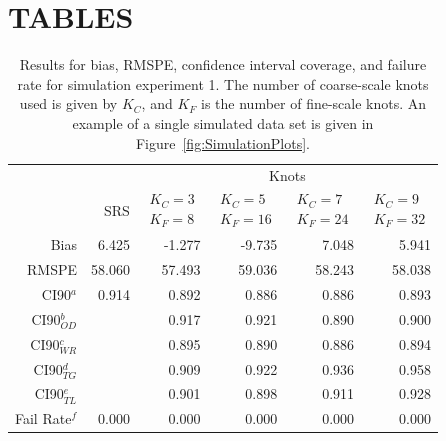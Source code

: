 \documentclass[12pt, titlepage]{article}\usepackage[]{graphicx}\usepackage[]{color}
\begin{document}
\clearpage

\section*{TABLES}



\footnotesize
\begin{table}[ht]
\caption{Results for bias, RMSPE, confidence interval coverage, and failure rate for simulation experiment 1. The number of coarse-scale knots used is given by $K_C$, and $K_F$ is the number of fine-scale knots. An example of a single simulated data set is given in Figure~\ref{fig:SimulationPlots}. \label{Tab:Sim1}}
\begin{center}
\begin{tabular}{rrrrrr}
  \hline
  \hline
	&  & \multicolumn{4}{c}{Knots} \\ 
 & SRS & $\begin{array}{c}K_C=3  \\ K_F=8 \end{array}$ & $\begin{array}{c}K_C=5  \\ K_F=16 \end{array}$ & $\begin{array}{c}K_C=7  \\ K_F=24 \end{array}$ & $\begin{array}{c}K_C=9  \\ K_F=32 \end{array}$ \\
  \hline
 Bias & 6.425 & -1.277 & -9.735 & 7.048 & 5.941 \\ 
  RMSPE & 58.060 & 57.493 & 59.036 & 58.243 & 58.038 \\ 
  CI90$^a$ & 0.914 & 0.892 & 0.886 & 0.886 & 0.893 \\ 
  CI90$_{OD}^b$ &  & 0.917 & 0.921 & 0.890 & 0.900 \\ 
  CI90$_{WR}^c$ &  & 0.895 & 0.890 & 0.886 & 0.894 \\ 
  CI90$_{TG}^d$ &  & 0.909 & 0.922 & 0.936 & 0.958 \\ 
  CI90$_{TL}^e$ &  & 0.901 & 0.898 & 0.911 & 0.928 \\ 
  Fail Rate$^f$ & 0.000 & 0.000 & 0.000 & 0.000 & 0.000 \\ 
  


\end{tabular}
\end{center}
\end{table}
\end{document}
